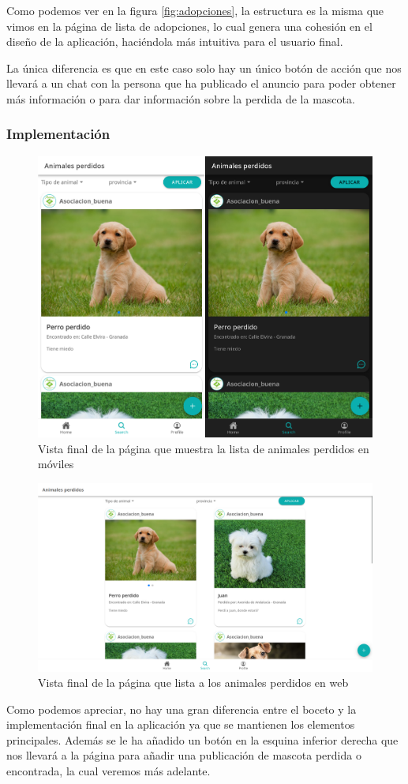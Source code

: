 Como podemos ver en la figura \ref{fig:adopciones}, la estructura es la misma que vimos en la página de lista de adopciones, lo cual genera una cohesión en el diseño de la aplicación, haciéndola más intuitiva para el usuario final.

La única diferencia es que en este caso solo hay un único botón de acción que nos llevará a un chat con la persona que ha publicado el anuncio para poder obtener más información o para dar información sobre la perdida de la mascota.

\subsubsection{Implementación}
\begin{figure}[H]
	\centering
	\includegraphics[width=0.5\linewidth]{"sprint 2/hu3/disenoFinal"}
	\caption{Vista final de la página que muestra la lista de animales perdidos en móviles}
	\label{fig:listaAdop}
\end{figure}

\begin{figure}[H]
	\centering
	\includegraphics[width=0.8\linewidth]{"sprint 2/hu3/disenoFinalWeb"}
	\caption{Vista final de la página que lista a los animales perdidos en web}
	\label{fig:disenofinalweb}
\end{figure}

Como podemos apreciar, no hay una gran diferencia entre el boceto y la implementación final en la aplicación ya que se mantienen los elementos principales. Además se le ha añadido un botón en la esquina inferior derecha que nos llevará a la página  para añadir una publicación de mascota perdida o encontrada, la cual veremos más adelante.\\

